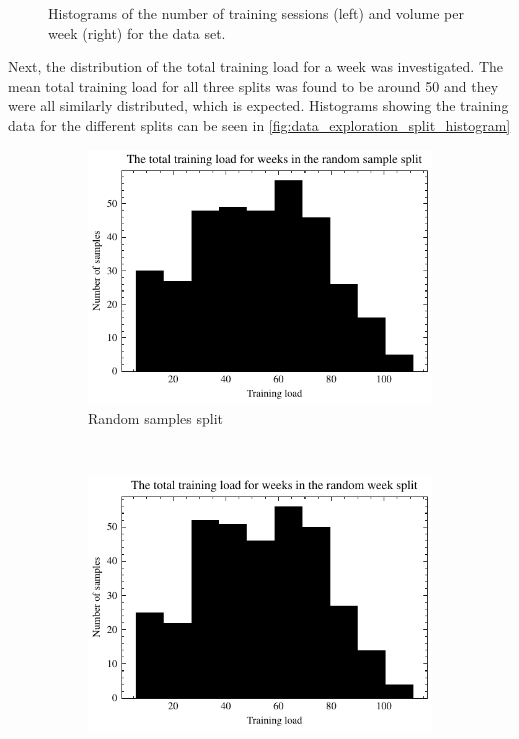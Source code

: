 \begin{figure}[ht]
\begin{subfigure}[t]{0.48\textwidth}
    \end{subfigure}
    \caption{Histograms of the number of training sessions (left) and volume per week (right) for the data set.}
    \label{fig:data_exploration_histograms}
\end{figure}

Next, the distribution of the total training load for a week was investigated.
The mean total training load for all three splits was found to be around 50 and they were all similarly distributed, which is expected.
Histograms showing the training data for the different splits can be seen in \cref{fig:data_exploration_split_histogram}

\begin{figure}[ht]
    \centering
    \begin{subfigure}[t]{0.48\textwidth}
        \centering
        \includegraphics[width=\textwidth]{chapters/figures/data_exploration/random_sample_hist.pdf}
        \captionsetup{width=.9\linewidth}
        \caption{Random samples split}
    \end{subfigure}%
    ~ 
    \begin{subfigure}[t]{0.48\textwidth}
        \centering
        \includegraphics[width=\textwidth]{chapters/figures/data_exploration/random_week_hist.pdf}

\end{subfigure}
\end{figure}

